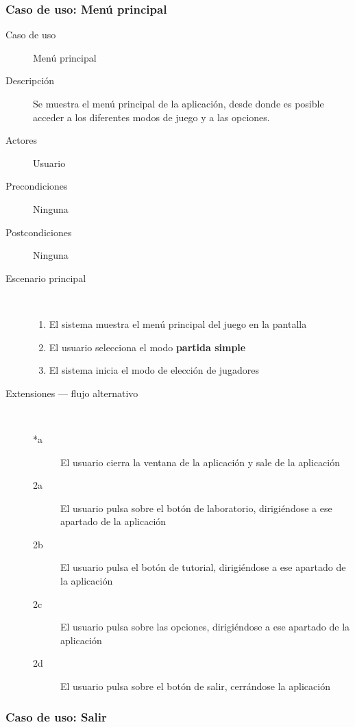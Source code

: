 \subsubsection{Caso de uso: Menú principal}

\begin{description}
    \item[Caso de uso] Menú principal
    \item[Descripción] Se muestra el menú principal de la aplicación, desde donde es posible acceder a los
        diferentes modos de juego y a las opciones.
    \item[Actores] Usuario
    \item[Precondiciones] Ninguna
    \item[Postcondiciones] Ninguna
    \item[Escenario principal] $\quad$
        \begin{enumerate}
            \item El sistema muestra el menú principal del juego en la pantalla
            \item El usuario selecciona el modo \textbf{partida simple}
            \item El sistema inicia el modo de elección de jugadores
        \end{enumerate}
    \item[Extensiones --- flujo alternativo] $\quad$
        \begin{description}
            \item[*a ] El usuario cierra la ventana de la aplicación y sale de la aplicación
            \item[2a ] El usuario pulsa sobre el botón de laboratorio, dirigiéndose a ese apartado de la aplicación
            \item[2b ] El usuario pulsa el botón de tutorial, dirigiéndose a ese apartado de la aplicación
            \item[2c ] El usuario pulsa sobre las opciones, dirigiéndose a ese apartado de la aplicación
            \item[2d ] El usuario pulsa sobre el botón de salir, cerrándose la aplicación
        \end{description}
   
\end{description}

\subsubsection{Caso de uso: Salir}

